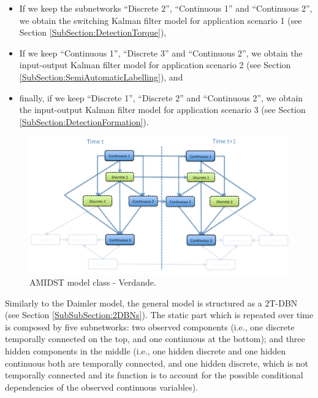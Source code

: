 \begin{itemize}
\item If we keep the subnetworks ``Discrete 2'', ``Continuous 1'' and ``Continuous 2'', we obtain the switching Kalman filter model for application scenario 1 (see Section \ref{SubSection:DetectionTorque}),
\item If we keep ``Continuous 1'', ``Discrete 3'' and ``Continuous 2'', we obtain the input-output Kalman filter model for application scenario 2 (see Section \ref{SubSection:SemiAutomaticLabelling}), and
\item finally, if we keep ``Discrete 1'', ``Discrete 2'' and ``Continuous 2'', we obtain the input-output Kalman filter model for application scenario 3  (see Section \ref{SubSection:DetectionFormation}).
\end{itemize}



\begin{figure}[ht!]
\begin{center}
\includegraphics[scale=0.39]{./figures/AMIDSTModelClassVerdande}
\caption{\label{Figure:AMIDSTModelClassVerdande} AMIDST model class - Verdande.}
\end{center}
\end{figure}


Similarly to the Daimler model, the general model is structured as a 2T-DBN (see Section \ref{SubSubSection:2DBNs}). The static part which is repeated over time is composed by five subnetworks: two observed components (i.e., one discrete temporally connected on the top, and one continuous at the bottom); and three hidden components in the middle (i.e., one hidden discrete and one hidden continuous both are temporally connected, and one hidden discrete, which is not temporally connected and its function is to account for the possible conditional dependencies of the observed continuous variables).  

